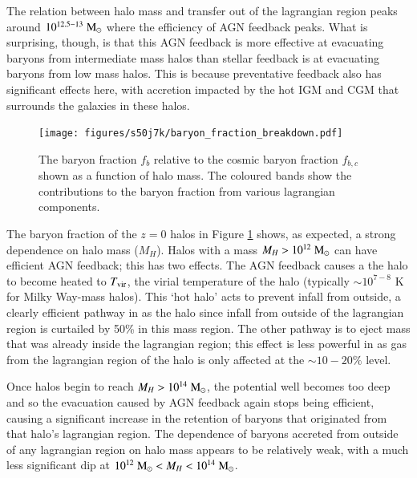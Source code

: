 The relation between halo mass and transfer out of the lagrangian region peaks
around $10^{12.5-13}\;{\rm M}_{\odot}{}$ where the efficiency of AGN feedback peaks. What
is surprising, though, is that this AGN feedback is more effective at evacuating
baryons from intermediate mass halos than stellar feedback is at evacuating
baryons from low mass halos. This is because preventative feedback also has
significant effects here, with accretion impacted by the hot IGM and CGM that
surrounds the galaxies in these halos.

\begin{figure}
	\centering
	\texttt{[image: figures/s50j7k/baryon\_fraction\_breakdown.pdf]}
	\vspace{-0.7cm}
	\caption{The baryon fraction $f_b$ relative to the cosmic baryon fraction
	$f_{b, c}$ shown as a function of halo mass. The coloured bands show the
	contributions to the baryon fraction from various lagrangian components.}
	\label{fig:baryonfraction}
\end{figure}

The baryon fraction of the $z=0$ halos in Figure \ref{fig:baryonfraction}
shows, as expected, a strong dependence on halo mass ($M_H$). Halos with a
mass  $M_H > 10^{12} \;{\rm M}_{\odot}{}$ can have efficient AGN feedback; this has two
effects. The AGN feedback causes a the halo to become heated to $T_{\rm
vir}$, the virial temperature of the halo (typically $\sim10^{7-8}$ K for Milky
Way-mass halos). This `hot halo' acts to prevent infall from outside, a
clearly efficient pathway in \simba{} as the halo since infall from outside of
the lagrangian region is curtailed by 50\% in this mass region.  The other
pathway is to eject mass that was already inside the lagrangian region; this
effect is less powerful in \simba{} as gas from the lagrangian region of the
halo is only affected at the $\sim10-20\%$ level.

Once halos begin to reach $M_H > 10^{14} \;{\rm M}_{\odot}{}$, the potential well
becomes too deep and so the evacuation caused by AGN feedback again stops
being efficient, causing a significant increase in the retention of baryons
that originated from that halo's lagrangian region. The dependence of baryons
accreted from outside of any lagrangian region on halo mass appears to be
relatively weak, with a much less significant dip at $10^{12} \;{\rm M}_{\odot}{} < M_H
< 10^{14} \;{\rm M}_{\odot}{}$.
